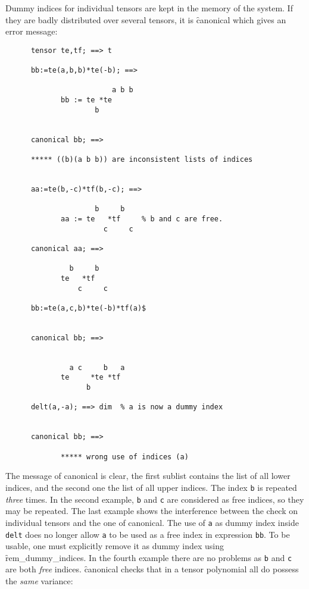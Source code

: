 Dummy indices for individual tensors are kept in the memory of
the system. If they are badly distributed over several tensors,
it is \f{canonical} which gives an error message:
\begin{verbatim}
      tensor te,tf; ==> t

      bb:=te(a,b,b)*te(-b); ==>

                         a b b
             bb := te *te
                     b


      canonical bb; ==>

      ***** ((b)(a b b)) are inconsistent lists of indices


      aa:=te(b,-c)*tf(b,-c); ==>

                     b     b
             aa := te   *tf     % b and c are free.
                       c     c

      canonical aa; ==>

               b     b
             te   *tf
                 c     c

      bb:=te(a,c,b)*te(-b)*tf(a)$


      canonical bb; ==>


               a c     b   a
             te     *te *tf
                   b

      delt(a,-a); ==> dim  % a is now a dummy index


      canonical bb; ==>

             ***** wrong use of indices (a)
\end{verbatim}
The message of canonical is clear, the first sublist contains the
list of all lower indices, and the second one the list of all upper
indices. The index  \texttt{b} is repeated \emph{three} times.
In the second example, \texttt{b} and \texttt{c} are considered as free
indices, so they may be repeated.
The last example shows the interference between the check on
individual tensors and the one of canonical. The use of \texttt{a}
as dummy index inside \texttt{delt} does no longer allow \texttt{a}
to be used as a free index in expression \texttt{bb}.
To be usable, one must explicitly remove it as dummy index
using \f{rem\_dummy\_indices}.
In the fourth example there are no problems as \texttt{b} and
\texttt{c} are both \emph{free} indices.
\f{canonical} checks that in a tensor polynomial
all do possess the \emph{same} variance:
